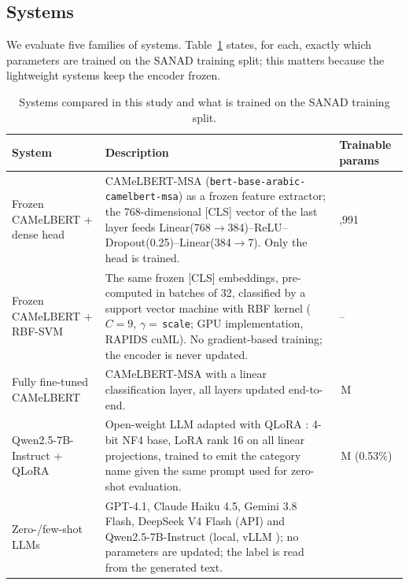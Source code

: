 \documentclass[preprint,12pt,authoryear]{elsarticle}
\newif\ifrevmarkup
\DeclareRobustCommand{\rev}[1]{\ifrevmarkup{\color{blue}#1}\else#1\fi}
\newcommand{\revblock}{\ifrevmarkup\color{blue}\fi}
\begin{document}
{\revblock}

\subsection{Systems}
\label{models}

\rev{We evaluate five families of systems. Table~\ref{tab:models_summary} states, for each, exactly which parameters are trained on the SANAD training split; this matters because the lightweight systems keep the encoder frozen.}

\begin{table}[!ht]
\revblock
\centering
\caption{Systems compared in this study and what is trained on the SANAD training split.}
\label{tab:models_summary}
\small
\begin{tabularx}{\textwidth}{@{}>{\raggedright\arraybackslash}p{3.0cm} >{\raggedright\arraybackslash}X >{\raggedleft\arraybackslash}p{1.7cm}@{}}
\toprule
\textbf{System} & \textbf{Description} & \textbf{Trainable params} \\
\midrule
Frozen CAMeLBERT + dense head & CAMeLBERT-MSA (\texttt{bert-base-arabic-\allowbreak camelbert-msa}) \cite{DBLP:journals/corr/abs-2103-06678} as a frozen feature extractor; the 768-dimensional [CLS] vector of the last layer feeds Linear(768$\to$384)--\allowbreak ReLU--\allowbreak Dropout(0.25)--\allowbreak Linear(384$\to$7). Only the head is trained. & 297,991 \\
Frozen CAMeLBERT + RBF-SVM & The same frozen [CLS] embeddings, pre-computed in batches of 32, classified by a support vector machine with RBF kernel ($C=9$, $\gamma=$\,\texttt{scale}; GPU implementation, RAPIDS cuML). No gradient-based training; the encoder is never updated. & -- \\
Fully fine-tuned CAMeLBERT & CAMeLBERT-MSA with a linear classification layer, all layers updated end-to-end. & 109.1\,M \\
Qwen2.5-7B-Instruct + QLoRA & Open-weight LLM \cite{qwen2025qwen25} adapted with QLoRA \cite{dettmers2023qlora,hu2022lora}: 4-bit NF4 base, LoRA rank 16 on all linear projections, trained to emit the category name given the same prompt used for zero-shot evaluation. & 40.4\,M (0.53\%) \\
Zero-/few-shot LLMs & GPT-4.1, Claude Haiku 4.5, Gemini 3.8 Flash, DeepSeek V4 Flash (API) and Qwen2.5-7B-Instruct (local, vLLM \cite{kwon2023vllm}); no parameters are updated; the label is read from the generated text. & 0 \\
\bottomrule
\end{tabularx}
\end{table}
\end{document}
